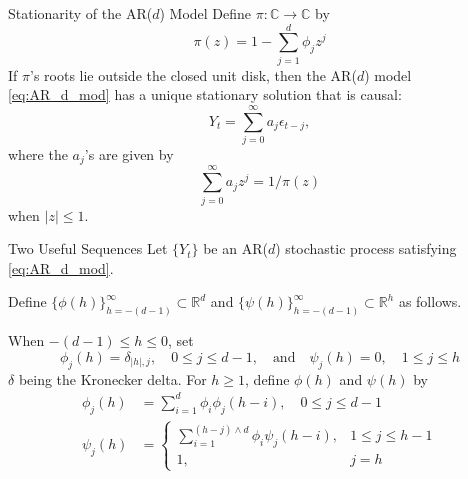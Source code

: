 \documentclass{beamer}
\def\C{\mathbb C}
\def\R{\mathbb R}
\def\Z{{\mathbb Z}}
\begin{document}

\begin{frame}{Stationarity of the AR($d$) Model}
    Define $\pi : \C \to \C$ by
    \[
    \pi(z) = 1 - \sum_{j = 1}^d \phi_j z^j
    \]
    If $\pi$'s roots lie outside the closed unit disk, then the AR($d$) model \eqref{eq:AR_d_mod} has a unique stationary solution that is causal:
    \begin{equation}\label{eq:AR_d_mod_solution}
        Y_t = \sum_{j = 0}^\infty a_j \epsilon_{t - j},
    \end{equation}
    where the $a_j$'s are given by
    \[
    \sum_{j = 0}^\infty a_j z^j = 1 / \pi(z)
    \]
    when $|z| \le 1$.
\end{frame}

\begin{frame}{Two Useful Sequences}
    Let $\{Y_t\}$ be an AR($d$) stochastic process satisfying \eqref{eq:AR_d_mod}.

    \smallskip
    
    Define $\{\phi(h)\}_{h = -(d - 1)}^{\infty} \subset \R^d$ and $\{\psi(h)\}_{h = -(d - 1)}^{\infty} \subset \R^h$ as follows.
    
    When $-(d - 1) \le h \le 0$, set
    \[
    \phi_j(h) = \delta_{|h|, j}, \quad 0 \le j \le d - 1 \label{eq:phi_recur_rel1}, \quad \text{and} \quad
    \psi_j(h) = 0, \quad 1 \le j \le h
    \]
    $\delta$ being the Kronecker delta. For $h \ge 1$, define $\phi(h)$ and $\psi(h)$ by
    \begin{align*}
        \phi_j(h) &= \sum_{i = 1}^d \phi_i\phi_j(h - i), \quad 0 \le j \le d - 1 \\
        \psi_j(h) &=
        \begin{cases}
            \sum_{i = 1}^{(h - j) \wedge d} \phi_i\psi_j(h - i), & 1 \le j \le h - 1 \\
            1, & j = h
        \end{cases}
    \end{align*}
\end{frame}
\end{document}
